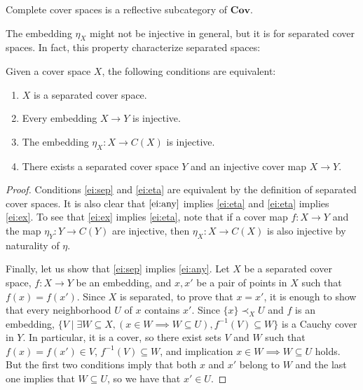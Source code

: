 \documentclass[reqno]{amsart}
\theoremstyle{definition}
\theoremstyle{remark}
\numberwithin{figure}{section}
\newcommand{\rb}{\prec}
\newcommand{\cat}[1]{\mathbf{#1}}
\begin{document}
\begin{cor}
Complete cover spaces is a reflective subcategory of $\cat{Cov}$.
\end{cor}


The embedding $\eta_X$ might not be injective in general, but it is for separated cover spaces.
In fact, this property characterize separated spaces:

\begin{prop}
Given a cover space $X$, the following conditions are equivalent:
\begin{enumerate}
\item \label{ei:sep} $X$ is a separated cover space.
\item \label{ei:any} Every embedding $X \to Y$ is injective.
\item \label{ei:eta} The embedding $\eta_X : X \to C(X)$ is injective.
\item \label{ei:ex} There exists a separated cover space $Y$ and an injective cover map $X \to Y$.
\end{enumerate}
\end{prop}
\begin{proof}
Conditions \eqref{ei:sep} and \eqref{ei:eta} are equivalent by the definition of separated cover spaces.
It is also clear that $\eqref{ei:any}$ implies \eqref{ei:eta} and \eqref{ei:eta} implies \eqref{ei:ex}.
To see that \eqref{ei:ex} implies \eqref{ei:eta}, note that if a cover map $f : X \to Y$ and the map $\eta_Y : Y \to C(Y)$ are injective,
then $\eta_X : X \to C(X)$ is also injective by naturality of $\eta$.

Finally, let us show that \eqref{ei:sep} implies \eqref{ei:any}.
Let $X$ be a separated cover space, $f : X \to Y$ be an embedding, and $x,x'$ be a pair of points in $X$ such that $f(x) = f(x')$.
Since $X$ is separated, to prove that $x = x'$, it is enough to show that every neighborhood $U$ of $x$ contains $x'$.
Since $\{ x \} \rb_X U$ and $f$ is an embedding, $\{ V \mid \exists W \subseteq X, (x \in W \implies W \subseteq U), f^{-1}(V) \subseteq W \}$ is a Cauchy cover in $Y$.
In particular, it is a cover, so there exist sets $V$ and $W$ such that $f(x) = f(x') \in V$, $f^{-1}(V) \subseteq W$, and implication $x \in W \implies W \subseteq U$ holds.
But the first two conditions imply that both $x$ and $x'$ belong to $W$ and the last one implies that $W \subseteq U$, so we have that $x' \in U$.
\end{proof}
\end{document}
